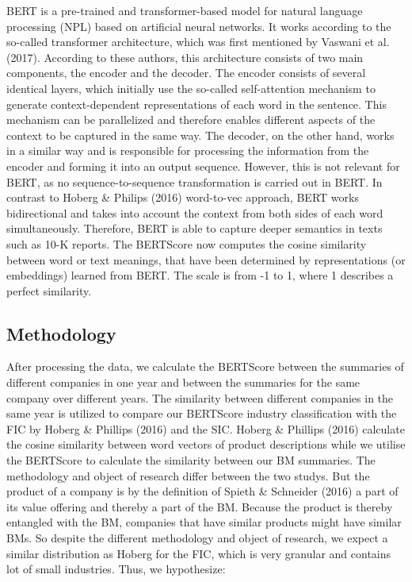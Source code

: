 \documentclass[
]{article}
\begin{document}
BERT is a pre-trained and transformer-based model for natural language
processing (NPL) based on artificial neural networks. It works according
to the so-called transformer architecture, which was first mentioned by
Vaswani et al. (2017). According to these authors, this architecture
consists of two main components, the encoder and the decoder. The
encoder consists of several identical layers, which initially use the
so-called self-attention mechanism to generate context-dependent
representations of each word in the sentence. This mechanism can be
parallelized and therefore enables different aspects of the context to
be captured in the same way. The decoder, on the other hand, works in a
similar way and is responsible for processing the information from the
encoder and forming it into an output sequence. However, this is not
relevant for BERT, as no sequence-to-sequence transformation is carried
out in BERT. In contrast to Hoberg \& Philips (2016) word-to-vec
approach, BERT works bidirectional and takes into account the context
from both sides of each word simultaneously. Therefore, BERT is able to
capture deeper semantics in texts such as 10-K reports. The BERTScore
now computes the cosine similarity between word or text meanings, that
have been determined by representations (or embeddings) learned from
BERT. The scale is from -1 to 1, where 1 describes a perfect similarity.

\subsection{Methodology}\label{methodology}

After processing the data, we calculate the BERTScore between the
summaries of different companies in one year and between the summaries
for the same company over different years. The similarity between
different companies in the same year is utilized to compare our
BERTScore industry classification with the FIC by Hoberg \& Phillips
(2016) and the SIC. Hoberg \& Phillips (2016) calculate the cosine
similarity between word vectors of product descriptions while we utilise
the BERTScore to calculate the similarity between our BM summaries. The
methodology and object of research differ between the two studys. But
the product of a company is by the definition of Spieth \& Schneider
(2016) a part of its value offering and thereby a part of the BM.
Because the product is thereby entangled with the BM, companies that
have similar products might have similar BMs. So despite the different
methodology and object of research, we expect a similar distribution as
Hoberg for the FIC, which is very granular and contains lot of small
industries. Thus, we hypothesize:
\end{document}
